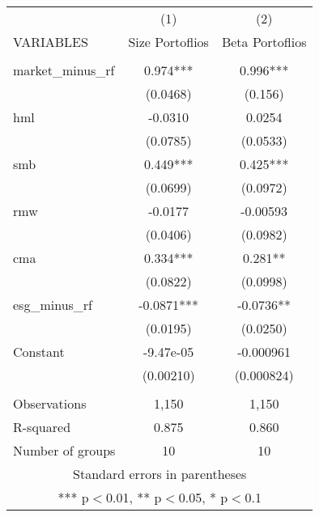 \begin{tabular}{lcc} \hline
 & (1) & (2) \\
VARIABLES & Size Portoflios & Beta Portoflios \\ \hline
 &  &  \\
market\_minus\_rf & 0.974*** & 0.996*** \\
 & (0.0468) & (0.156) \\
hml & -0.0310 & 0.0254 \\
 & (0.0785) & (0.0533) \\
smb & 0.449*** & 0.425*** \\
 & (0.0699) & (0.0972) \\
rmw & -0.0177 & -0.00593 \\
 & (0.0406) & (0.0982) \\
cma & 0.334*** & 0.281** \\
 & (0.0822) & (0.0998) \\
esg\_minus\_rf & -0.0871*** & -0.0736** \\
 & (0.0195) & (0.0250) \\
Constant & -9.47e-05 & -0.000961 \\
 & (0.00210) & (0.000824) \\
 &  &  \\
Observations & 1,150 & 1,150 \\
R-squared & 0.875 & 0.860 \\
 Number of groups & 10 & 10 \\ \hline
\multicolumn{3}{c}{ Standard errors in parentheses} \\
\multicolumn{3}{c}{ *** p$<$0.01, ** p$<$0.05, * p$<$0.1} \\
\end{tabular}
